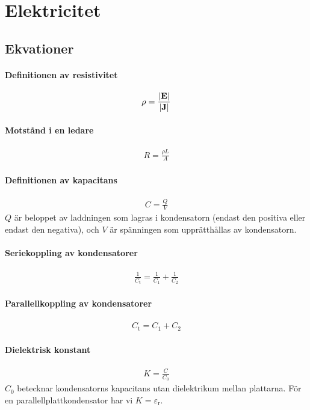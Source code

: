 \section{Elektricitet}

\subsection{Ekvationer}

\paragraph{Definitionen av resistivitet}
\begin{align*}
	\rho = \frac{\abs{\vect{E}}}{\abs{\vect{J}}}
\end{align*}

\paragraph{Motstånd i en ledare}
\begin{align*}
	R = \frac{\rho L}{A}
\end{align*}

\paragraph{Definitionen av kapacitans}
\begin{align*}
	C = \frac{Q}{V}
\end{align*}
$Q$ är beloppet av laddningen som lagras i kondensatorn (endast den positiva eller endast den negativa), och $V$ är spänningen som upprätthållas av kondensatorn.

\paragraph{Seriekoppling av kondensatorer}
\begin{align*}
	\frac{1}{C_\text{t}} = \frac{1}{C_1} + \frac{1}{C_2}
\end{align*}

\deriv

\paragraph{Parallellkoppling av kondensatorer}
\begin{align*}
	C_\text{t} = C_1 + C_2
\end{align*}

\paragraph{Dielektrisk konstant}
\begin{align*}
	K = \frac{C}{C_0}
\end{align*}
$C_0$ betecknar kondensatorns kapacitans utan dielektrikum mellan plattarna. För en parallellplattkondensator har vi $K = \varepsilon_\text{r}$.

